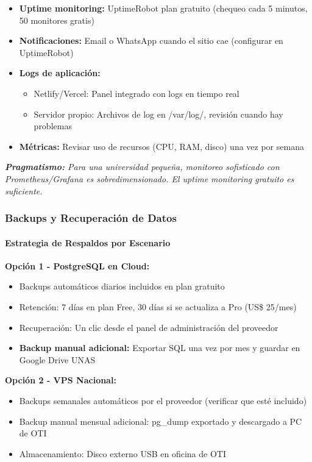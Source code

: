 \documentclass[12pt,a4paper]{article}
\begin{document}
\begin{itemize}[noitemsep]
    \item \textbf{Uptime monitoring:} UptimeRobot plan gratuito (chequeo cada 5 minutos, 50 monitores gratis)
    \item \textbf{Notificaciones:} Email o WhatsApp cuando el sitio cae (configurar en UptimeRobot)
    \item \textbf{Logs de aplicación:} 
    \begin{itemize}
        \item Netlify/Vercel: Panel integrado con logs en tiempo real
        \item Servidor propio: Archivos de log en /var/log/, revisión cuando hay problemas
    \end{itemize}
    \item \textbf{Métricas:} Revisar uso de recursos (CPU, RAM, disco) una vez por semana
\end{itemize}

\textit{\textbf{Pragmatismo:} Para una universidad pequeña, monitoreo sofisticado con Prometheus/Grafana es sobredimensionado. El uptime monitoring gratuito es suficiente.}

\subsubsection{Backups y Recuperación de Datos}

\paragraph{Estrategia de Respaldos por Escenario}

\textbf{Opción 1 - PostgreSQL en Cloud:}
\begin{itemize}[noitemsep]
    \item Backups automáticos diarios incluidos en plan gratuito
    \item Retención: 7 días en plan Free, 30 días si se actualiza a Pro (US\$ 25/mes)
    \item Recuperación: Un clic desde el panel de administración del proveedor
    \item \textbf{Backup manual adicional:} Exportar SQL una vez por mes y guardar en Google Drive UNAS
\end{itemize}

\textbf{Opción 2 - VPS Nacional:}
\begin{itemize}[noitemsep]
    \item Backups semanales automáticos por el proveedor (verificar que esté incluido)
    \item Backup manual mensual adicional: pg\_dump exportado y descargado a PC de OTI
    \item Almacenamiento: Disco externo USB en oficina de OTI
\end{itemize}
\end{document}

